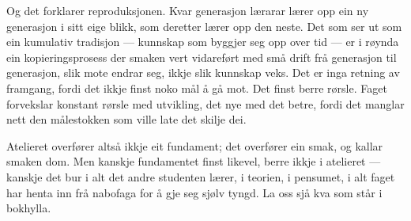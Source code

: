 Og det forklarer reproduksjonen. Kvar generasjon lærarar lærer opp ein ny generasjon i sitt eige blikk, som deretter lærer opp den neste. Det som ser ut som ein kumulativ tradisjon — kunnskap som byggjer seg opp over tid — er i røynda ein kopieringsprosess der smaken vert vidareført med små drift frå generasjon til generasjon, slik mote endrar seg, ikkje slik kunnskap veks. Det er inga retning av framgang, fordi det ikkje finst noko mål å gå mot. Det finst berre rørsle. Faget forvekslar konstant rørsle med utvikling, det nye med det betre, fordi det manglar nett den målestokken som ville late det skilje dei.

\vignett

Atelieret overfører altså ikkje eit fundament; det overfører ein smak, og kallar smaken dom. Men kanskje fundamentet finst likevel, berre ikkje i atelieret — kanskje det bur i alt det andre studenten lærer, i teorien, i pensumet, i alt faget har henta inn frå nabofaga for å gje seg sjølv tyngd. La oss sjå kva som står i bokhylla.

